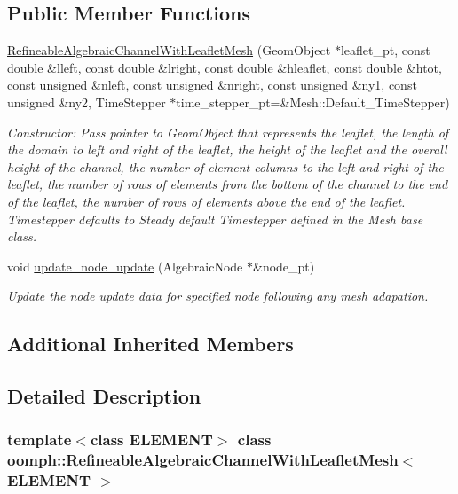 \subsection*{Public Member Functions}
\begin{DoxyCompactItemize}
\item 
\hyperlink{classoomph_1_1RefineableAlgebraicChannelWithLeafletMesh_a6f67c948b27ed9350e57b2c92b573610}{Refineable\+Algebraic\+Channel\+With\+Leaflet\+Mesh} (Geom\+Object $\ast$leaflet\+\_\+pt, const double \&lleft, const double \&lright, const double \&hleaflet, const double \&htot, const unsigned \&nleft, const unsigned \&nright, const unsigned \&ny1, const unsigned \&ny2, Time\+Stepper $\ast$time\+\_\+stepper\+\_\+pt=\&Mesh\+::\+Default\+\_\+\+Time\+Stepper)
\begin{DoxyCompactList}\small\item\em Constructor\+: Pass pointer to Geom\+Object that represents the leaflet, the length of the domain to left and right of the leaflet, the height of the leaflet and the overall height of the channel, the number of element columns to the left and right of the leaflet, the number of rows of elements from the bottom of the channel to the end of the leaflet, the number of rows of elements above the end of the leaflet. Timestepper defaults to Steady default Timestepper defined in the Mesh base class. \end{DoxyCompactList}\item 
void \hyperlink{classoomph_1_1RefineableAlgebraicChannelWithLeafletMesh_a8ee7168fbb84bb87880a2590dd52eaa8}{update\+\_\+node\+\_\+update} (Algebraic\+Node $\ast$\&node\+\_\+pt)
\begin{DoxyCompactList}\small\item\em Update the node update data for specified node following any mesh adapation. \end{DoxyCompactList}\end{DoxyCompactItemize}
\subsection*{Additional Inherited Members}


\subsection{Detailed Description}
\subsubsection*{template$<$class E\+L\+E\+M\+E\+NT$>$\newline
class oomph\+::\+Refineable\+Algebraic\+Channel\+With\+Leaflet\+Mesh$<$ E\+L\+E\+M\+E\+N\+T $>$}

